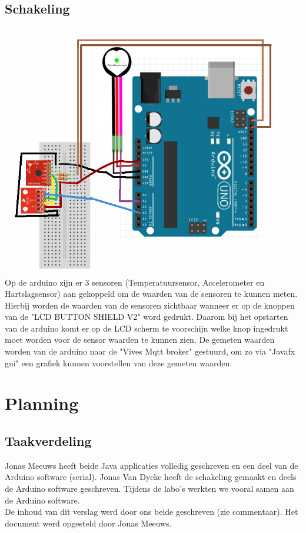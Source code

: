 \documentclass[a4paper]{report}
\begin{document}
    \section{Schakeling}
        \includegraphics[width=\textwidth]{schema}\\
        Op de arduino zijn er 3 sensoren (Temperatuursensor, Accelerometer en Hartslagsensor) aan gekoppeld om de waarden van de sensoren te kunnen meten.
        Hierbij worden de waarden van de sensoren zichtbaar wanneer er op de knoppen van de "LCD BUTTON SHIELD V2" word gedrukt.
        Daarom bij het opstarten van de arduino komt er op de LCD scherm te voorschijn welke knop ingedrukt moet worden voor de sensor waarden te kunnen zien.
        De gemeten waarden worden van de arduino naar de "Vives Mqtt broker" gestuurd, om zo via "Javafx gui" een grafiek kunnen voorstellen van deze gemeten waarden.
    
\chapter{Planning}
    \section{Taakverdeling}
        Jonas Meeuws heeft beide Java applicaties volledig geschreven en een deel van de Arduino software (serial).
        Jonas Van Dycke heeft de schakeling gemaakt en deels de Arduino software geschreven.
        Tijdens de labo's werkten we vooral samen aan de Arduino software.\\
        De inhoud van dit verslag werd door ons beide geschreven (zie commentaar).
        Het document werd opgesteld door Jonas Meeuws.
        
\end{document}
